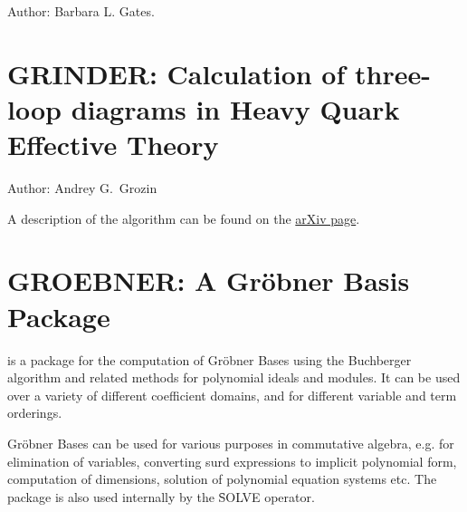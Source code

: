 Author: Barbara L. Gates.


\iffalse
\newpage

\section{GNUPLOT: Display of Functions and Surfaces}
\indexpackage{PLOT}\indexpackage{GNUPLOT}

This package is an interface to the popular GNUPLOT package.
It allows you to display functions in 2D and surfaces in 3D
on a variety of output devices including X terminals, PC monitors, and
postscript and Latex printer files.

NOTE: The GNUPLOT package may not be included in all versions of \REDUCE.

Author: Herbert Melenk.


\fi

\newpage

\section{GRINDER: Calculation of three-loop diagrams in Heavy Quark Effective Theory}
\label{GRINDER}

Author: Andrey G.~Grozin

A description of the algorithm can be found on the \href{https://arxiv.org/abs/hep-ph/0002266}{arXiv page}.

\newpage

\section{GROEBNER: A Gr\"{o}bner Basis Package}
\label{GROEBNER}

 is a package for the computation of Gr\"obner
Bases using the Buchberger algorithm and related methods
for polynomial ideals and modules.  It can be used over a variety of
different coefficient domains, and for different variable and term
orderings.

Gr\"obner Bases can be used for various purposes in commutative
algebra, e.g. for elimination of variables,
converting surd expressions to implicit polynomial form,
computation of dimensions, solution of polynomial equation systems
 etc.
The package is also used internally by the \f{SOLVE}
operator.

